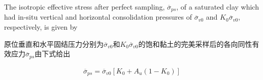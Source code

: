 \begin{paracol}{2}
    \switchcolumn*

    The isotropic effective stress after perfect sampling, $\overline{\sigma}_{ps}$, of a saturated clay which had in-situ vertical and horizontal consolidation pressures of $\overline{\sigma}_{v0}$ and $K_0\overline{\sigma}_{v0}$, respectively, is given by

    \switchcolumn

    原位垂直和水平固结压力分别为$\overline{\sigma}_{v0}$和$K_0\overline{\sigma}_{v0}$的饱和黏土的完美采样后的各向同性有效应力$\overline{\sigma}_{ps}$由下式给出

\end{paracol}

\begin{align}
    \overline{\sigma}_{ps}=\overline{\sigma}_{v0}\left[K_0+A_u(1-K_0)\right]
    \label{equation:1}
\end{align}


